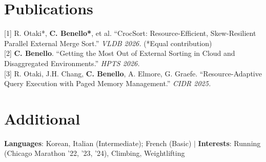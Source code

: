 \documentclass[letterpaper,10pt]{article}
\begin{document}
\section{Publications}
 \begin{itemize}[leftmargin=0.015in, label={}]
    \small{\item{
     {[1] R. Otaki*, \textbf{C. Benello*}, et al. ``CrocSort: Resource-Efficient, Skew-Resilient Parallel External Merge Sort.'' \textit{VLDB 2026.} (*Equal contribution)} \\
     {[2] \textbf{C. Benello}. ``Getting the Most Out of External Sorting in Cloud and Disaggregated Environments.'' \textit{HPTS 2026.}} \\
     {[3] R. Otaki, J.H. Chang, \textbf{C. Benello}, A. Elmore, G. Graefe. ``Resource-Adaptive Query Execution with Paged Memory Management.'' \textit{CIDR 2025.}}
    }}
 \end{itemize}\vspace{-9pt}

\section{Additional}
 \begin{itemize}[leftmargin=0.015in, label={}]
    \small{\item{
     \textbf{Languages}: Korean, Italian (Intermediate); French (Basic) $|$ \textbf{Interests}: Running (Chicago Marathon '22, '23, '24), Climbing, Weightlifting
    }}
 \end{itemize}
\end{document}
